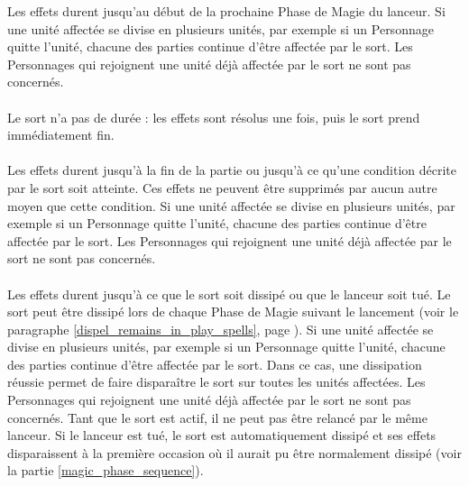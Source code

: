 Les effets durent jusqu'au début de la prochaine Phase de Magie du lanceur. Si une unité affectée se divise en plusieurs unités, par exemple si un Personnage quitte l'unité, chacune des parties continue d'être affectée par le sort. Les Personnages qui rejoignent une unité déjà affectée par le sort ne sont pas concernés.

\paragraph{\instant}

Le sort n'a pas de durée : les effets sont résolus une fois, puis le sort prend immédiatement fin.

\paragraph{\permanent}

Les effets durent jusqu'à la fin de la partie ou jusqu'à ce qu'une condition décrite par le sort soit atteinte. Ces effets ne peuvent être supprimés par aucun autre moyen que cette condition. Si une unité affectée se divise en plusieurs unités, par exemple si un Personnage quitte l'unité, chacune des parties continue d'être affectée par le sort. Les Personnages qui rejoignent une unité déjà affectée par le sort ne sont pas concernés.

\hypertarget{remainsinplay}{\paragraph{\remainsinplay}}

Les effets durent jusqu'à ce que le sort soit dissipé ou que le lanceur soit tué. Le sort peut être dissipé lors de chaque Phase de Magie suivant le lancement (voir le paragraphe \ref{dispel_remains_in_play_spells}, page \pageref{dispel_remains_in_play_spells}). Si une unité affectée se divise en plusieurs unités, par exemple si un Personnage quitte l'unité, chacune des parties continue d'être affectée par le sort. Dans ce cas, une dissipation réussie permet de faire disparaître le sort sur toutes les unités affectées. Les Personnages qui rejoignent une unité déjà affectée par le sort ne sont pas concernés. Tant que le sort est actif, il ne peut pas être relancé par le même lanceur. Si le lanceur est tué, le sort est automatiquement dissipé et ses effets disparaissent à la première occasion où il aurait pu être normalement dissipé (voir la partie \ref{magic_phase_sequence}).

